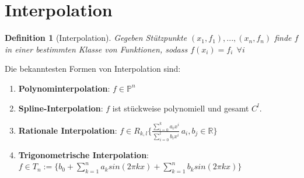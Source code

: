 \documentclass[10pt,a4paper]{article}
\newtheorem{definition}{Definition}
\begin{document}
	\section{Interpolation}
	\begin{definition}[Interpolation]
		Gegeben Stützpunkte $(x_1, f_1), ..., (x_n, f_n)$ finde $f$ in einer bestimmten Klasse von Funktionen, sodass $f(x_i) = f_i \ \ \forall i$ 
	\end{definition}
	Die bekanntesten Formen von Interpolation sind:
	\begin{enumerate}
		\item \textbf{Polynominterpolation}: $f\in \mathbb{P}^n$
		\item \textbf{Spline-Interpolation}: $f$ ist stückweise polynomiell und gesamt $C^l$.
		\item \textbf{Rationale Interpolation}: $f \in R_{k, l}\{\frac{\sum_{i=0}^k a_ix^i}{\sum_{i=0}^lb_ix^i}\, a_i, b_j \in \mathbb{R}\}$
		\item \textbf{Trigonometrische Interpolation}: $f \in T_n := \{b_0 + \sum_{k=1}^na_ksin(2\pi kx) +\sum_{k=1}^nb_ksin(2\pi kx) \}$
	\end{enumerate}
\end{document}
